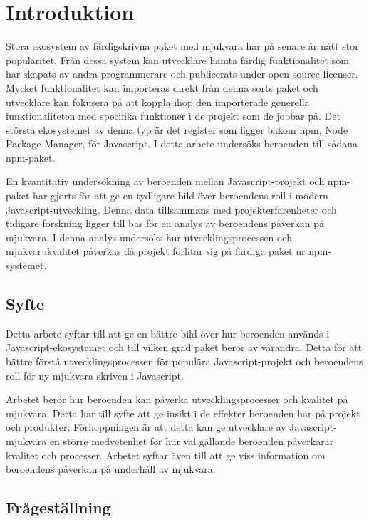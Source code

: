 \section{Introduktion}
\label{sec:joel_o-introduction}
Stora ekosystem av färdigskrivna paket med mjukvara har på senare år nått stor popularitet.\cite{Wittern:2016} Från dessa system kan utvecklare hämta färdig funktionalitet som har skapats av andra programmerare och publicerats under open-source-licenser. Mycket funktionalitet kan importeras direkt från denna sorts paket och utvecklare kan fokusera på att koppla ihop den importerade generella funktionaliteten med specifika funktioner i de projekt som de jobbar på. Det största ekosystemet av denna typ är det register som ligger bakom npm, Node Package Manager, för Javascript.\cite{Decan2018} I detta arbete undersöks beroenden till sådana npm-paket.

En kvantitativ undersökning av beroenden mellan Javascript-projekt och npm-paket har gjorts för att ge en tydligare bild över beroendens roll i modern Javascript-utveckling. Denna data tillsammans med projekterfarenheter och tidigare forskning ligger till bas för en analys av beroendens påverkan på mjukvara. I denna analys undersöks hur utvecklingsprocessen och mjukvarukvalitet påverkas då projekt förlitar sig på färdiga paket ur npm-systemet.

\subsection{Syfte}
Detta arbete syftar till att ge en bättre bild över hur beroenden används i Javascript-ekosystemet och till vilken grad paket beror av varandra. Detta för att bättre förstå utvecklingsprocessen för populära Javascript-projekt och beroendens roll för ny mjukvara skriven i Javascript.

Arbetet berör hur beroenden kan påverka utvecklingsprocesser och kvalitet på mjukvara. Detta har till syfte att ge insikt i de effekter beroenden har på projekt och produkter. Förhoppningen är att detta kan ge utvecklare av Javascript-mjukvara en större medvetenhet för hur val gällande beroenden påverkarar kvalitet och processer. Arbetet syftar även till att ge viss information om beroendens påverkan på underhåll av mjukvara.

\subsection{Frågeställning}
\label{subsec:joel_o-research-questions}

